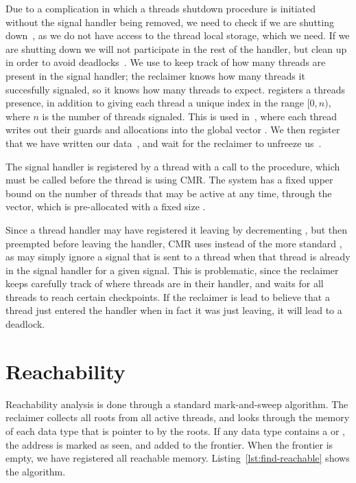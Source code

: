 Due to a complication in which a threads shutdown procedure is initiated without the signal handler
being removed, we need to check if we are shutting down~, as we do not have access to
the thread local storage, which we need. If we are shutting down we will not participate in the
rest of the handler, but clean up in order to avoid deadlocks~.
We use  to keep track of how many threads are present in the signal handler;
the reclaimer knows how many threads it succesfully signaled, so it knows how many threads to
expect.  registers a threads presence, in addition to giving each thread a unique
index in the range $[0, n)$, where $n$ is the number of threads signaled. This is used
in~, where each thread writes out their guards and allocations into the global vector
. We then register that we have written our data~, and wait for the
reclaimer to unfreeze us~.



The signal handler is registered by a thread with a call to the  procedure,
which must be called before the thread is using CMR\@. 
The system has a fixed upper bound on the number of threads that may be active at any time, through
the  vector, which is pre-allocated with a fixed size .

Since a thread handler may have registered it leaving by decrementing ,
but then preempted before leaving the handler, CMR uses  instead of the more
standard , as  may simply ignore a signal that is sent to a
thread when that thread is already in the signal handler for a given signal.
This is problematic, since the reclaimer keeps carefully track of where threads are in their
handler, and waits for all threads to reach certain checkpoints. If the reclaimer is lead to
believe that a thread just entered the handler when in fact it was just leaving, it will lead to a
deadlock.


\section{Reachability\label{sec:reachability}}

Reachability analysis is done through a standard mark-and-sweep algorithm. The reclaimer collects
all roots from all active threads, and looks through the memory of each data type that is pointer
to by the roots. If any data type contains a  or , the address is marked as seen,
and added to the frontier. When the frontier is empty, we have registered all reachable memory.
Listing~\ref{lst:find-reachable} shows the algorithm.

